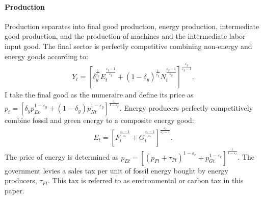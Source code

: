 

\paragraph{Production}
Production separates into final good production, energy production, intermediate good production, and the production of machines and the intermediate labor input good. 
The final sector is perfectly competitive combining  non-energy and energy goods according to:
\begin{align*}
Y_t=\left[\delta_y^\frac{1}{\varepsilon_y}E_{t}^{\frac{\varepsilon_y-1}{\varepsilon_y}}+(1-\delta_y)^\frac{1}{\varepsilon_y}N_{t}^{\frac{\varepsilon_y-1}{\varepsilon_y}}\right]^\frac{\varepsilon_y}{\varepsilon_y-1}.
\end{align*} 
I take the final good as the numeraire and define its price as $p_t=\left[\delta_yp_{Et}^{1-\varepsilon_y}+(1-\delta_y)p_{Nt}^{1-\varepsilon_y}\right]^{\frac{1}{1-\varepsilon_y}}$.
Energy producers perfectly competitively combine fossil and green energy to a composite energy good:
\begin{align*}
E_t=\left[F_t^\frac{\varepsilon_e-1}{\varepsilon_e}+G_t^\frac{\varepsilon_e-1}{\varepsilon_e}\right]^\frac{\varepsilon_e}{\varepsilon_e-1}.
\end{align*}
The price of energy is determined as  $p_{Et}= \left[(p_{Ft}+\tau_{Ft})^{1-\varepsilon_e}+p_{Gt}^{1-\varepsilon_e}\right]^\frac{1}{{1-\varepsilon_e}}$.
The government levies a sales tax per unit of fossil energy bought by energy producers, $\tau_{Ft}$. This tax is referred to as environmental or carbon tax in this paper. 

